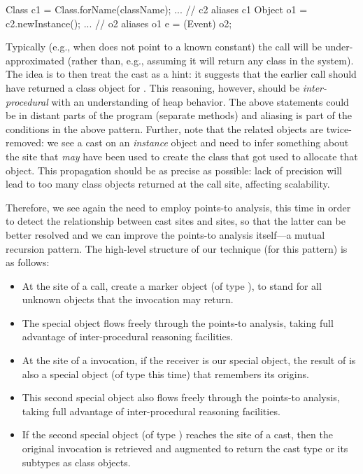 \begin{javacodelinum}
Class c1 = Class.forName(className);
...      // c2 aliases c1
Object o1 = c2.newInstance(); 
...      // o2 aliases o1
e = (Event) o2; 
\end{javacodelinum}

Typically (e.g., when  does not point to a known
constant) the  call will be under-approximated (rather
than, e.g., assuming it will return any class in the system). The idea
is to then treat the cast as a hint: it suggests that the earlier
 call should have returned a class object for
. This reasoning, however, should be \emph{inter-procedural}
with an understanding of heap behavior.  The above statements could be
in distant parts of the program (separate methods) and aliasing is
part of the conditions in the above pattern.  Further, note that the
related objects are twice-removed: we see a cast on an \emph{instance}
object and need to infer something about the  site that
\emph{may} have been used to create the class that got used to
allocate that object. This propagation should be as precise as
possible: lack of precision will lead to too many class objects
returned at the  call site, affecting scalability.

Therefore, we see again the need to employ points-to analysis, this
time in order to detect the relationship between cast sites and
 sites, so that the latter can be better resolved and we
can improve the points-to analysis itself---a mutual recursion
pattern. The high-level structure of our technique (for this pattern)
is as follows:

\begin{itemize}
\item At the site of a  call, create a marker object (of
  type ), to stand for all unknown
  objects that the invocation may return.
\item The special object flows freely through the points-to analysis,
  taking full advantage of inter-procedural reasoning facilities.
\item At the site of a  invocation, if the receiver
  is our special object, the result of  is also a
  special object (of type  this time)
  that remembers its  origins.
\item This second special object also flows freely through the
  points-to analysis, taking full advantage of inter-procedural
  reasoning facilities.
\item If the second special object (of type
  ) reaches the site of a cast, then
  the original  invocation is retrieved and augmented to
  return the cast type or its subtypes as class objects.
\end{itemize}

